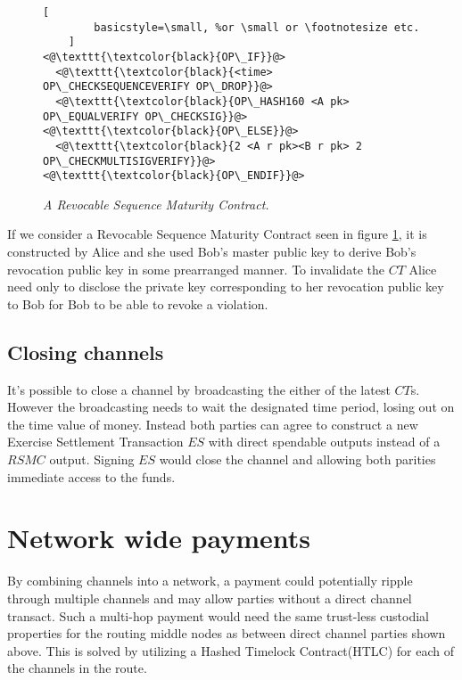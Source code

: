 \begin{figure}[hbt!]
	\centering
	\begin{lstlisting}[
		basicstyle=\small, %or \small or \footnotesize etc.
	]
<@\texttt{\textcolor{black}{OP\_IF}}@>
  <@\texttt{\textcolor{black}{<time> OP\_CHECKSEQUENCEVERIFY OP\_DROP}}@>
  <@\texttt{\textcolor{black}{OP\_HASH160 <A pk> OP\_EQUALVERIFY OP\_CHECKSIG}}@>
<@\texttt{\textcolor{black}{OP\_ELSE}}@>
  <@\texttt{\textcolor{black}{2 <A r pk><B r pk> 2 OP\_CHECKMULTISIGVERIFY}}@>
<@\texttt{\textcolor{black}{OP\_ENDIF}}@>
	\end{lstlisting}
	
	\caption{\textit{ A Revocable Sequence Maturity Contract.
	}}
	\label{fig:RSMC}
\end{figure}

If we consider a Revocable Sequence Maturity Contract seen in figure \ref{fig:RSMC}, it is constructed by Alice and she used Bob's master public key to derive Bob's revocation public key in some prearranged manner. To invalidate the $CT$ Alice need only to disclose the private key corresponding to her revocation public key to Bob for Bob to be able to revoke a violation. 

\subsection{Closing channels}

It's possible to close a channel by broadcasting the either of the latest $CT$s. However the broadcasting needs to wait the designated time period, losing out on the time value of money. Instead both parties can agree to construct a new Exercise Settlement Transaction $ES$ with direct spendable outputs instead of a $RSMC$ output. Signing $ES$ would close the channel and allowing both parities immediate access to the funds.

\section{Network wide payments}

By combining channels into a network, a payment could potentially ripple through multiple channels and may allow parties without a direct channel transact. Such a multi-hop payment would need the same trust-less custodial properties for the routing middle nodes as between direct channel parties shown above. This is solved by utilizing a Hashed Timelock Contract(HTLC) for each of the channels in the route.

